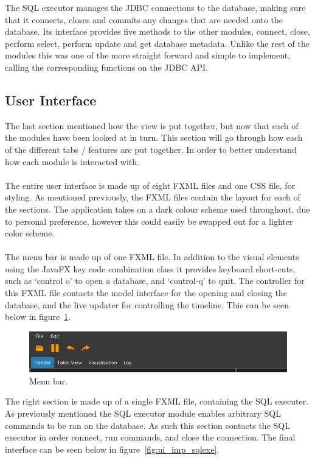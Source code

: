 The SQL executor manages the JDBC connections to the database, making sure that it connects, closes and commits any changes that are needed onto the database. Its interface provides five methods to the other modules, connect, close, perform select, perform update and get database metadata. Unlike the rest of the modules this was one of the more straight forward and simple to implement, calling the corresponding functions on the JDBC API.

\subsection{User Interface}
\label{subsec:user_interface_imp}

The last section mentioned how the view is put together, but now that each of the modules have been looked at in turn. This section will go through how each of the different tabs / features are put together. In order to better understand how each module is interacted with.
\\\\
The entire user interface is made up of eight FXML files and one CSS file, for styling. As mentioned previously, the FXML files contain the layout for each of the sections. The application takes on a dark colour scheme used throughout, due to personal preference, however this could easily be swapped out for a lighter color scheme. 
\\\\
The menu bar is made up of one FXML file. In addition to the visual elements using the JavaFX key code combination class it provides keyboard short-cuts, such as `control o' to open a database, and `control-q' to quit. The controller for this FXML file  contacts the model interface for the opening and closing the database, and the live updater for controlling the timeline.  This can be seen below in figure~\ref{fig:ui_screen}.

\begin{figure}[H]
	\centering
	\includegraphics[scale=0.32]{images/ui_screen.png}
	\caption{Menu bar.}
	\label{fig:ui_screen}
\end{figure}

The right section is made up of a single FXML file, containing the SQL executer. As previously mentioned the SQL executor module enables arbitrary SQL commands to be ran on the database. As such this section contacts the SQL executor in order connect, run commands, and close the connection. The final interface can be seen below in figure~\ref{fig:ui_imp_sqlexe}.

